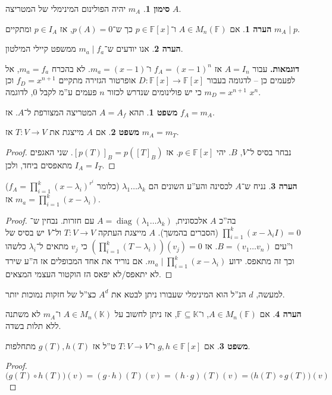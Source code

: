 \documentclass[a4paper]{article}
\newcommand\K     {\mathbb{K}}
\DeclareMathOperator{\diag}    {diag}
\newcommand\F         {\mathbb{F}}
\newcommand\co        {\colon}
\renewcommand\lg      {\lambda}
\newcommand\cl [1]    {\left ( #1 \right )}
\theoremstyle{definition}
\newtheorem{Theorem}{משפט}
\newtheorem{Remark}{הערה}
\newtheorem{Notion}{סימון}
\newcommand\theo  [1] {\begin{Theorem}#1\end{Theorem}}
\newcommand\rmark [1] {\begin{Remark}#1\end{Remark}}
\newcommand\noti  [1] {\begin{Notion}#1\end{Notion}}
\begin{document}
	\noti{$m_A$ יהיה הפולינום המינימלי של המטריצה $A$. }
	
	\rmark{אם $A \in M_n(\F)$ ו־$p \in \F[x]$ כך ש־$p(A) = 0$, אז $p \in I_A$ ומתקיים $m_A \mid p$. }
	
	\rmark{אנו יודעים ש־$m_a \mid f_a$ ממשפט קיילי המילטון. }
	
	\textbf{דוגמאות. }עבור $A = I_n$ אז $f_A = (x - 1)^{n}$ ו־$m_a = (x - 1)$. לא בהכרח $m_a = f_a$, אל לפעמים כן – לדגומה בעבור $D \co \F[x] \to \F[x]$ אופרטור הגזירה מתקיים $f_D = x^{n + 1}$ וכן $m_D = x^{n + 1}$ כי יש פולינומים שנדרש לכזור $n$ פעמים ע''מ לקבל $0$, לדוגמה $x^{n}$. 
	
	\theo{תהא $A =A_f$ המטריצה המצורפת ל־$A$. אז $f_A = m_A$.}
	\theo{אם $A$ מייצגת את $T \co V \to V$ אז $m_A = m_T$.}
	\begin{proof}
		נבחר בסיס ל־$V$, $B$. יהי $p \in \F[x]$. אז $[p(T)]_B = p([T]_B)$. שני האגפים מתאפסים ביחד, ולכן $I_A = I_T$. 
	\end{proof}
	\rmark{נניח ש־$A$ לכסינה והע''ע השונים הם $\lg_1 \dots \lg_k$ (כלומר $f_A = \prod_{i = 1}^{k}(x - \lg_i)^{r^i}$) אז $m_a = \prod_{i = 1}^{k}(x - \lg_i)$. }
	
	\begin{proof}
		בה''כ $A$ אלכסונית, $A = \diag(\lg_1 \dots \lg_k)$ עם חזרות. נבחין ש־$\prod_{i = 1}^{k} (x - \lg_iI) = 0$ (הסברים בהמשך). $A$ מייצגת העתקה $T \co V \to V$ ול־$V$ יש בסיס של ו''עים $B = (v_1 \dots v_n)$.  אז $\cl{\prod_{i = 1}^{k}(T - \lg_i)}(v_j) = 0$ כי $v_j$ מתאים ל־$\lg_i$ כלשהו וכך זה מתאפס. ידוע $m_a \mid \prod_{i = 1}^{k}(x - \lg_i)$. אם נוריד את אחד המכופלים אז ה''ע שירד לא יתאפס/לא יפאס הז הוקטור העצמי המצאים. 
	\end{proof}
	למעשה, $d$ הנ''ל הוא המינימלי שעבורו ניתן לבטא את $A^{d}$ כצ''ל של חזקות נמוכות יותר. 
	
	\rmark{אם $A \in M_n(\F)$, ו־$\F \subseteq \K$, אז ניתן לחשוב על $A \in M_n(\K)$ ו־$m_A$ לא משתנה ללא תלות בשדה. }
	\theo{אם $g, h \in \F[x]$ ו־$T \co V \to V$ ט''ל אז $g(T), h(T)$ מתחלפות. }
	\begin{proof}
		\[ \big(g(T) \circ h(T)\big)(v) = (g \cdot h)(T)(v) = (h \cdot g)(T)(v) = \big(h(T) \circ g(T) \big)(v) \]
	\end{proof}
	
\end{document}
